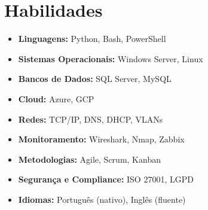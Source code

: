 \documentclass[a4paper,10pt]{article}
\begin{document}
\section{Habilidades}
\begin{itemize}
    \item \textbf{Linguagens:} Python, Bash, PowerShell
    \item \textbf{Sistemas Operacionais:} Windows Server, Linux
    \item \textbf{Bancos de Dados:} SQL Server, MySQL
    \item \textbf{Cloud:} Azure, GCP
    \item \textbf{Redes:} TCP/IP, DNS, DHCP, VLANs
    \item \textbf{Monitoramento:} Wireshark, Nmap, Zabbix
    \item \textbf{Metodologias:} Agile, Scrum, Kanban
    \item \textbf{Segurança e Compliance:} ISO 27001, LGPD
    \item \textbf{Idiomas:} Português (nativo), Inglês (fluente)
\end{itemize}
\end{document}
